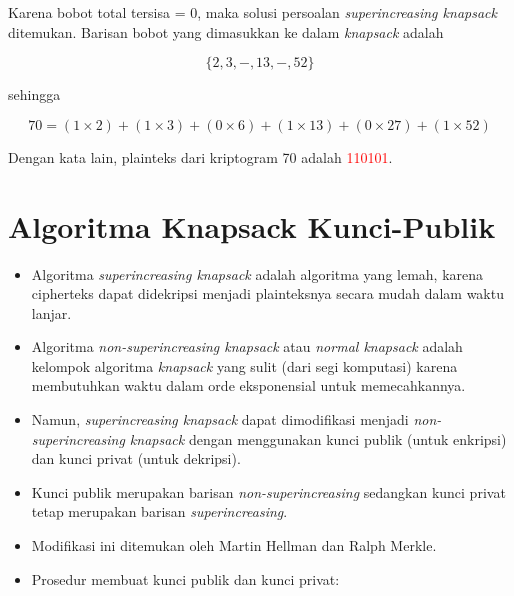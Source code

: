 \documentclass{article}
\begin{document}
Karena bobot total tersisa = 0, maka solusi persoalan \textit{superincreasing knapsack} ditemukan. Barisan bobot yang dimasukkan ke dalam \textit{knapsack} adalah

\[ \{2, 3, -, 13, -, 52\} \]

sehingga

\[ 70 = (1 \times 2) + (1 \times 3) + (0 \times 6) + (1 \times 13) + (0 \times 27) + (1 \times 52) \]

Dengan kata lain, plainteks dari kriptogram 70 adalah \textcolor{red}{110101}.

\newpage


\section*{Algoritma Knapsack Kunci-Publik}

\begin{itemize}
    \item Algoritma \textit{superincreasing knapsack} adalah algoritma yang lemah, karena cipherteks dapat didekripsi menjadi plainteksnya secara mudah dalam waktu lanjar.
    \item Algoritma \textit{non-superincreasing knapsack} atau \textit{normal knapsack} adalah kelompok algoritma \textit{knapsack} yang sulit (dari segi komputasi) karena membutuhkan waktu dalam orde eksponensial untuk memecahkannya.
    \item Namun, \textit{superincreasing knapsack} dapat dimodifikasi menjadi \textit{non-superincreasing knapsack} dengan menggunakan kunci publik (untuk enkripsi) dan kunci privat (untuk dekripsi).
\end{itemize}

\newpage


\begin{itemize}
    \item Kunci publik merupakan barisan \textit{non-superincreasing} sedangkan kunci privat tetap merupakan barisan \textit{superincreasing}.
    \item Modifikasi ini ditemukan oleh Martin Hellman dan Ralph Merkle.
\end{itemize}

\newpage


\begin{itemize}
    \item Prosedur membuat kunci publik dan kunci privat:
\end{itemize}
\end{document}
